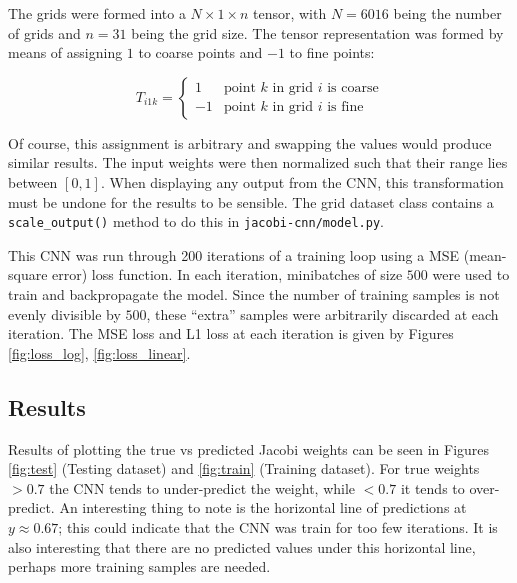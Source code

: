 The grids were formed into a $N\times 1 \times n$ tensor, with $N=6016$ being the number of grids and $n=31$ being the grid size.  The tensor representation was formed by means of assigning $1$ to coarse points and $-1$ to fine points:

$$
T_{i1k} = \begin{cases}
1 & \text{point $k$ in grid $i$ is coarse}\\
-1 & \text{point $k$ in grid $i$ is fine}
\end{cases}
$$

Of course, this assignment is arbitrary and swapping the values would produce similar results.  The input weights were then normalized such that their range lies between $\left[0, 1\right]$.  When displaying any output from the CNN, this transformation must be undone for the results to be sensible.  The grid dataset class contains a \texttt{scale\_output()} method to do this in \texttt{jacobi-cnn/model.py}.

This CNN was run through 200 iterations of a training loop using a MSE (mean-square error) loss function.  In each iteration, minibatches of size $500$ were used to train and backpropagate the model.  Since the number of training samples is not evenly divisible by $500$, these ``extra'' samples were arbitrarily discarded at each iteration.  The MSE loss and L1 loss at each iteration is given by Figures \ref{fig:loss_log}, \ref{fig:loss_linear}.

\subsection{Results}

Results of plotting the true vs predicted Jacobi weights can be seen in Figures \ref{fig:test} (Testing dataset) and \ref{fig:train} (Training dataset).  For true weights $>0.7$ the CNN tends to under-predict the weight, while $<0.7$ it tends to over-predict.  An interesting thing to note is the horizontal line of predictions at $y\approx0.67$; this could indicate that the CNN was train for too few iterations.  It is also interesting that there are no predicted values under this horizontal line, perhaps more training samples are needed.



